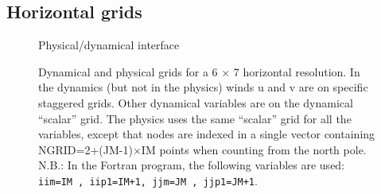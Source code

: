 \subsection{Horizontal grids}

\begin{figure}
\begin{center}
\centerline{}
\caption{Physical/dynamical interface}
\label{fg:fidyn}
\end{center}
\end{figure}

\begin{figure}
\centerline{}
\caption{Dynamical and physical grids for a 6 $\times$ 7 horizontal resolution.
In the dynamics (but not in the physics) winds u and v are on specific
staggered grids. Other dynamical variables are on the dynamical ``scalar'' grid.
The physics uses the same ``scalar'' grid for all the variables,
except that nodes are indexed in a single vector containing
NGRID=2+(JM-1)$\times$IM points when counting from the north pole.\\
N.B.: In the Fortran program, the following variables are used:
 {\tt iim=IM , iip1=IM+1, jjm=JM , jjp1=JM+1}.}
\label{fg:grid}
\end{figure}






